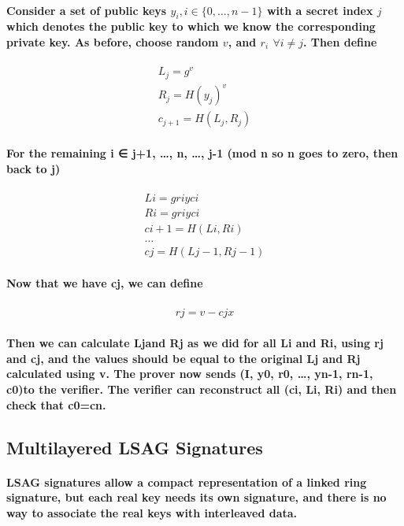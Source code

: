 \documentclass{article}
\begin{document}
\paragraph{Consider a set of public keys $y_i, i \in \{0, …, n-1\}$ with a secret index $j$ which denotes the public key to which we know the corresponding private key.  As before, choose random $v$, and $r_i$ $\forall i \ne j$.  Then define}

\begin{eqnarray}
  L_j = g^v\\
  R_j = H(y_j)^v\\
  c_{j+1} = H(L_j,R_j)
\end{eqnarray}

\paragraph{For the remaining i ∈ {j+1, …, n, …, j-1} (mod n so n goes to zero, then back to j)}

\begin{eqnarray}
  Li=griyci\\
  Ri=griyci\\
  ci+1=H(Li,Ri)\\
  … \\
  cj=H(Lj-1,Rj-1)
\end{eqnarray}

\paragraph{Now that we have cj, we can define}

\begin{eqnarray}
  rj=v-cjx
\end{eqnarray}

\paragraph{Then we can calculate Ljand Rj as we did for all Li and Ri, using rj and cj, and the values should be equal to the original Lj and Rj calculated using v. The prover now sends (I, y0, r0, …, yn-1, rn-1, c0)to the verifier.  The verifier can reconstruct all (ci, Li, Ri) and then check that c0=cn.}


\subsection{Multilayered LSAG Signatures}

\paragraph{LSAG signatures allow a compact representation of a linked ring signature, but each real key needs its own signature, and there is no way to associate the real keys with interleaved data.}
\end{document}
